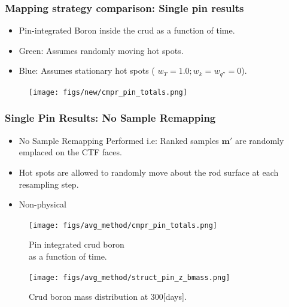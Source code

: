 \documentclass[t, pdftex]{beamer}
\begin{document}
\begin{frame}
\frametitle{Mapping strategy comparison: Single pin results}
\begin{itemize}
    \item Pin-integrated Boron inside the crud as a function of time.  
    \item {\color{utgreen} Green: Assumes randomly moving hot spots.} 
    \item {\color{blue} Blue: Assumes stationary hot spots ( $w_T=1.0; w_k=w_{q''}=0$).}
\end{itemize}

\vspace{-16pt}
\begin{figure}[!htbp]
\centering
\texttt{[image: figs/new/cmpr\_pin\_totals.png]}
\label{model_overview}
\end{figure}
\end{frame}


\begin{frame}
\frametitle{Single Pin Results: No Sample Remapping}
\vspace{-16pt}
\scriptsize{
\begin{itemize}
    \item No Sample Remapping Performed i.e:
    Ranked samples $\mathbf m'$ are randomly emplaced on the CTF faces.
    \item Hot spots are allowed to randomly move about the rod surface at each resampling step.
    \item Non-physical
\end{itemize}
}
\begin{figure}[!htbp]
    \centering
    \begin{minipage}{.5\textwidth}
        \texttt{[image: figs/avg\_method/cmpr\_pin\_totals.png]}
        \caption{\centering Pin integrated crud boron \\ as a function of time.} 
        \label{fig:crud_pre_map}
    \end{minipage}%
    \begin{minipage}{.5\textwidth}
        \texttt{[image: figs/avg\_method/struct\_pin\_z\_bmass.png]}
        \caption{\centering Crud boron mass distribution at 300[days].}
        \label{fig:crud_post_map}
    \end{minipage}
\end{figure}
\end{frame}
\end{document}
